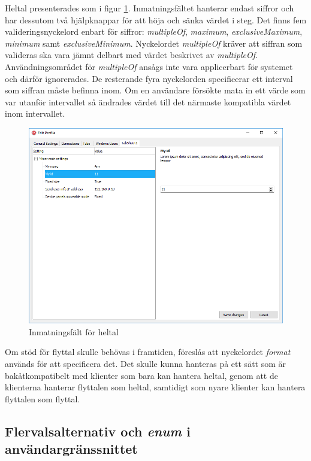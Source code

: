 Heltal presenterades som i figur \ref{fig:heltal}. Inmatningsfältet hanterar endast siffror och har dessutom två hjälpknappar för att höja och sänka värdet i steg. Det finns fem valideringsnyckelord enbart för siffror: \textit{multipleOf}, \textit{maximum}, \textit{exclusiveMaximum}, \textit{minimum} samt \textit{exclusiveMinimum}. Nyckelordet \textit{multipleOf} kräver att siffran som valideras ska vara jämnt delbart med värdet beskrivet av \textit{multipleOf}. Användningsområdet för \textit{multipleOf} ansågs inte vara applicerbart för systemet och därför ignorerades. De resterande fyra nyckelorden specificerar ett interval som siffran måste befinna inom. Om en användare försökte mata in ett värde som var utanför intervallet så ändrades värdet till det närmaste kompatibla värdet inom intervallet. \cite{Andrews2018}

\begin{figure}
	\includegraphics[width=\textwidth]{./images/gui/heltal.png}
	\vspace{-1.7em}
	\caption{Inmatningsfält för heltal}
	\label{fig:heltal}
\end{figure}

Om stöd för flyttal skulle behövas i framtiden, föreslås att nyckelordet \textit{format} används för att specificera det. Det skulle kunna hanteras på ett sätt som är bakåtkompatibelt med klienter som bara kan hantera heltal, genom att de klienterna hanterar flyttalen som heltal, samtidigt som nyare klienter kan hantera flyttalen som flyttal.

\FloatBarrier
\subsection{Flervalsalternativ och \textit{enum} i användargränssnittet}
\label{sec:arbetet:gui:enum}


